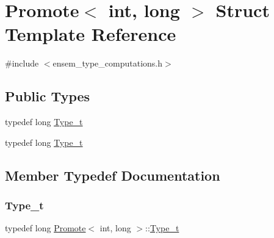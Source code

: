\hypertarget{structPromote_3_01int_00_01long_01_4}{}\section{Promote$<$ int, long $>$ Struct Template Reference}
\label{structPromote_3_01int_00_01long_01_4}


{\ttfamily \#include $<$ensem\+\_\+type\+\_\+computations.\+h$>$}

\subsection*{Public Types}
\begin{DoxyCompactItemize}
\item 
typedef long \mbox{\hyperlink{structPromote_3_01int_00_01long_01_4_a91635f57c2365f0636c638aa4f311374}{Type\+\_\+t}}
\item 
typedef long \mbox{\hyperlink{structPromote_3_01int_00_01long_01_4_a91635f57c2365f0636c638aa4f311374}{Type\+\_\+t}}
\end{DoxyCompactItemize}


\subsection{Member Typedef Documentation}
\mbox{\label{structPromote_3_01int_00_01long_01_4_a91635f57c2365f0636c638aa4f311374}} 
\subsubsection{\texorpdfstring{Type\_t}{Type\_t}\hspace{0.1cm}{\footnotesize\ttfamily [1/2]}}
{\footnotesize\ttfamily typedef long \mbox{\hyperlink{structPromote}{Promote}}$<$ int, long $>$\+::\mbox{\hyperlink{structPromote_3_01int_00_01long_01_4_a91635f57c2365f0636c638aa4f311374}{Type\+\_\+t}}}

\mbox{\label{structPromote_3_01int_00_01long_01_4_a91635f57c2365f0636c638aa4f311374}} 

